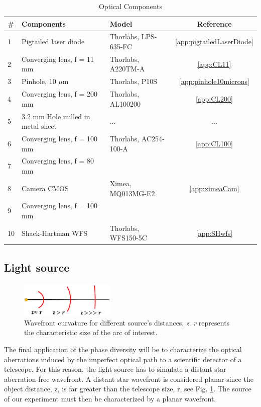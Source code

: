 \begin{table}
\caption[Optical Components]{Optical Components}
\label{tab:optComp}
\centering
\begin{tabular}{|l|l|l|c|}
\hline
\textbf{\#}& \textbf{Components} & \textbf{Model} & \textbf{Reference} \\\hline
1 & Pigtailed laser diode & Thorlabs, LPS-635-FC & \ref{app:pigtailedLaserDiode} \\\hline
2 & Converging lens, f = 11 mm & Thorlabs, A220TM-A & \ref{app:CL11} \\\hline
3 & Pinhole, 10 $\mu$m & Thorlabs, P10S & \ref{app:pinhole10microns} \\\hline
4 & Converging lens, f = 200 mm & Thorlabs, AL100200 & \ref{app:CL200} \\\hline
5 & 3.2 mm Hole milled in metal sheet & ... & ... \\\hline
6 & Converging lens, f = 100 mm & Thorlabs, AC254-100-A & \ref{app:CL100} \\\hline
7 & Converging lens, f = 80 mm & & \\\hline
8 & Camera CMOS & Ximea, MQ013MG-E2 & \ref{app:ximeaCam} \\\hline
9 & Converging lens, f = 100 mm & & \\\hline
10 & Shack-Hartman WFS & Thorlabs, WFS150-5C & \ref{app:SHwfs} \\\hline
\end{tabular}
\end{table}

\subsection{Light source}

\begin{figure}
\centering
\includegraphics[width=0.4\textwidth]{Figures/WFdistantSource.PNG}
\decoRulewrapFig
\caption[Wavefront curvature]{Wavefront curvature for different source's distances, \textit{z}. \textit{r} represents the characteristic size of the arc of interest.}
\label{fig:WFdistantSource}
\end{figure}

The final application of the phase diversity will be to characterize the optical aberrations induced by the imperfect optical path to a scientific detector of a telescope. For this reason, the light source has to simulate a distant star aberration-free wavefront. A distant star wavefront is considered planar since the object distance, z, is far greater than the telescope size, r, see Fig. \ref{fig:WFdistantSource}. The source of our experiment must then be characterized by a planar wavefront.


